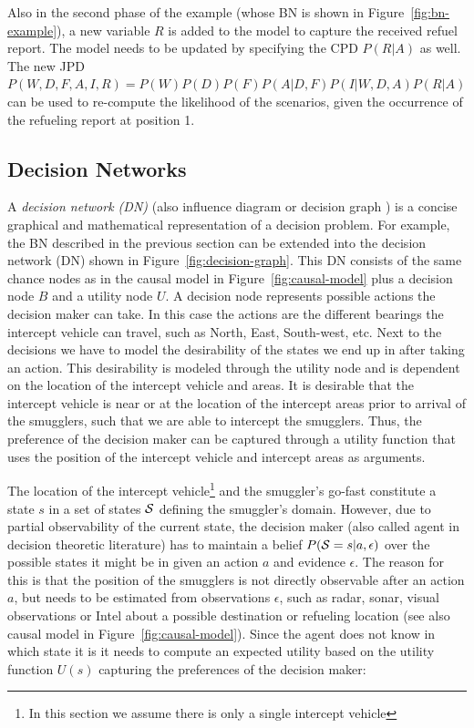 \documentclass[conference]{IEEEtran}
\begin{document}
Also in the second phase of the example (whose BN is shown in Figure~\ref{fig:bn-example}), a new variable $R$ is added to the model to capture the received refuel report. The model needs to be updated by specifying the CPD $P(R|A)$ as well. The new JPD $P(W,D,F,A,I,R) = P(W)P(D)P(F)P(A|D,F)P(I|W,D,A)P(R|A)$ can be used to re-compute the likelihood of the scenarios, given the occurrence of the refueling report at position 1.




\subsection{Decision Networks}\label{sec:decision-networks}

A {\em decision network (DN)} (also influence diagram or decision graph \cite{russell02bn,howard84rpada,jensen07book}) is a concise graphical and mathematical representation of a decision problem. For example, the BN described in the previous section can be extended into the decision network (DN) shown in Figure~\ref{fig:decision-graph}. This DN consists of the same chance nodes as in the causal model in Figure~\ref{fig:causal-model} plus a decision node $B$ and a utility node $U$. A decision node represents possible actions the decision maker can take. In this case the actions are the different bearings the intercept vehicle can travel, such as North, East, South-west, etc. Next to the decisions we have to model the desirability of the states we end up in after taking an action. This desirability is modeled through the utility node and is dependent on the location of the intercept vehicle and areas. It is desirable that the intercept vehicle is near or at the location of the intercept areas prior to arrival of the smugglers, such that we are able to intercept the smugglers. Thus, the preference of the decision maker can be captured through a utility function that uses the position of the intercept vehicle and intercept areas as arguments.

The location of the intercept vehicle\footnote{In this section we assume there is only a single intercept vehicle} and the smuggler's go-fast constitute a state $s$ in a set of states $\S$ defining the smuggler's domain. However, due to partial observability of the current state, the decision maker (also called agent in decision theoretic literature) has to maintain a belief $P(\S = s | a, \epsilon)$ over the possible states it might be in given an action $a$ and evidence $\epsilon$. The reason for this is that the position of the smugglers is not directly observable after an action $a$, but needs to be estimated from observations $\epsilon$, such as radar, sonar, visual observations or Intel about a possible destination or refueling location (see also causal model in Figure~\ref{fig:causal-model}). Since the agent does not know in which state it is it needs to compute an expected utility based on the utility function $U(s)$ capturing the preferences of the decision maker:
\end{document}
